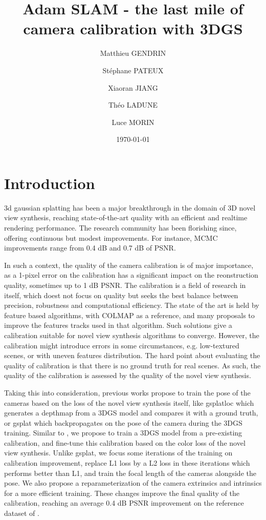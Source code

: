 \documentclass{article}
\title{Adam SLAM - the last mile of camera calibration with 3DGS}
\author[1,2]{Matthieu GENDRIN}
\author[1]{Stéphane PATEUX}
\author[2]{Xiaoran JIANG}
\author[1]{Théo LADUNE}
\author[2]{Luce MORIN}
\affil[1]{Orange Innovation}
\affil[2]{INSA}
\date{\today}
\begin{document}
\maketitle

\section{Introduction}
3d gaussian splatting \cite{kerbl20233d} has been a major breakthrough in the domain of 3D novel view synthesis, reaching state-of-the-art quality with an
efficient and realtime rendering performance. The research community has been florishing since, offering continuous but modest improvements.
For instance, MCMC \cite{kheradmand20243d} improvements range from 0.4 dB and 0.7 dB of PSNR.

In such a context, the quality of the camera calibration is of major importance, as a 1-pixel error on the calibration has a significant
impact on the reonstruction quality, sometimes up to 1 dB PSNR. The calibration is a field of research in itself, which doest not focus on quality but seeks 
the best balance between precision, robustness and computational efficiency. The state of the art is held by feature based algorithms,
with COLMAP \cite{schonberger2018robust} as a reference, and many proposals to improve the features tracks used in that algorithm.
Such solutions give a calibration suitable for novel view synthesis algorithms to converge. However, the calibration might introduce errors
in some circumstances, e.g. low-textured scenes, or with uneven features distribution. 
The hard point about evaluating the quality of calibration is that there is no ground truth for real scenes. As such, the quality of the 
calibration is assessed by the quality of the novel view synthesis.

Taking this into consideration, previous works propose to train the pose of the cameras based on the loss of the novel view synthesis itself, like 
gsplatloc \cite{zeller2024gsplatloc} which generates a depthmap from a 3DGS model and compares it with a ground truth, or gsplat \cite{ye2024gsplat}
which backpropagates on the pose of the camera during the 3DGS training. Similar to \cite{ye2024gsplat}, we propose to train a 3DGS model from
a pre-existing calibration, and fine-tune this calibration based on the color loss of the novel view synthesis. Unlike gsplat,
we focus some iterations of the training on calibration improvement, replace L1 loss by a L2 loss in these iterations which performs better than L1,
and train the focal length of the cameras alongside the pose. We also propose a reparameterization of the camera extrinsics and intrinsics
for a more efficient training. These changes improve the final quality of the calibration, reaching an average 0.4 dB PSNR improvement
on the reference dataset of \cite{kerbl20233d}.
\end{document}
